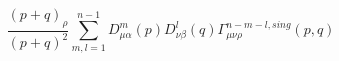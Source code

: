 \begin{equation} 
\frac{(p+q)_{\rho}}{(p+q)^2} \sum_{m,l=1}^{n-1}D_{\mu \alpha}^m(p)D_{\nu 
\beta}^l(q) \Gamma_{\mu \nu \rho}^{n-m-l, sing}(p,q) 
 \label{26} 
 \end{equation} 
